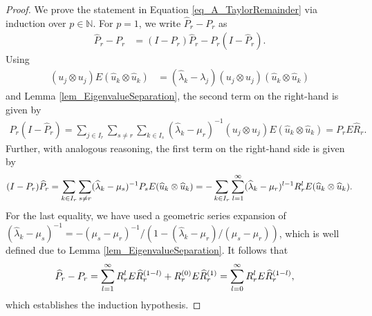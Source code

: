 \documentclass[10pt,a4paper]{amsart}
\begin{document}
\begin{proof} %
  We prove the statement in Equation \eqref{eq_A_TaylorRemainder} via induction
  over \( p \in \mathbb{N} \).
  For \( p = 1 \), we write \( \widehat{P}_{r} - P_r \) as
  \begin{align}
        \widehat{P}_{r} - P_{r} 
    & = 
        ( I - P_{r} ) \widehat{P}_{r} - P_{r} ( I - \widehat{P}_{r} ).
  \end{align}
  Using \begin{align}
  \label{eq_ProjectureToEigenvalueEquality}
  ( u_{j} \otimes u_{j} ) E ( \widehat{u}_{k} \otimes \widehat{u}_{k} ) 
  & = 
  ( \widehat{ \lambda }_{k} - \lambda_{j} ) 
  ( u_{j} \otimes u_{j} ) ( \widehat{u}_{k} \otimes \widehat{u}_{k} ) 
\end{align}
  and Lemma \ref{lem_EigenvalueSeparation}, the second term on the right-hand is given by
  \begin{align}
      P_{r} ( I - \widehat{P}_{r} ) 
    = 
      \sum_{ j \in I_{r} } 
      \sum_{ s \ne r } \sum_{ k \in I_{s} }
      ( \widehat{ \lambda }_{k} - \mu_{r} )^{-1}
      ( u_{j} \otimes u_{j} ) E ( \widehat{u}_{k} \otimes \widehat{u}_{k} ) 
    = 
      P_{r} E \widehat{R}_{r}.
  \end{align}
  Further, with analogous reasoning, the first term on the right-hand side is 
  given by
  \begin{align}
      ( I - P_{r} ) \widehat{P}_{r} 
    =
      \sum_{ k \in I_{r} } 
      \sum_{ s \ne r } ( \widehat{ \lambda }_{k} - \mu_{s} )^{-1} P_{s}
      E ( \widehat{u}_{k} \otimes \widehat{u}_{k} ) 
    = 
      - \sum_{ k \in I_{r} } \sum_{ l = 1 }^{ \infty } 
      ( \widehat{ \lambda }_{k} - \mu_{r} )^{ l - 1 } 
      R_{r}^{l} E ( \widehat{u}_{k} \otimes \widehat{u}_{k} ). 
    \notag
  \end{align}
  For the last equality, we have used a geometric series expansion of
  \( 
      ( \widehat{ \lambda }_{k} - \mu_{s} )^{-1} 
    = 
      - ( \mu_{s} - \mu_{r} )^{-1} / 
        ( 1 - ( \widehat{ \lambda }_{k} - \mu_{r} ) / ( \mu_{s} - \mu_{r} ) )
  \),
  which is well defined due to Lemma \ref{lem_EigenvalueSeparation}.
  It follows that 
  \begin{align}
            \widehat{P}_{r} - P_{r} 
    & = 
            \sum_{ l = 1 }^{ \infty } 
            R_{r}^{l} E \widehat{R}_{r}^{ ( 1 - l ) }
          + 
            R_{r}^{ (0) } E \widehat{R}_{r}^{ (1) }
    = 
            \sum_{ l = 0 }^{ \infty } 
            R_{r}^{l} E \widehat{R}_{r}^{ ( 1 - l ) },
    \notag
  \end{align}
  which establishes the induction hypothesis.


\end{proof}
\end{document}
